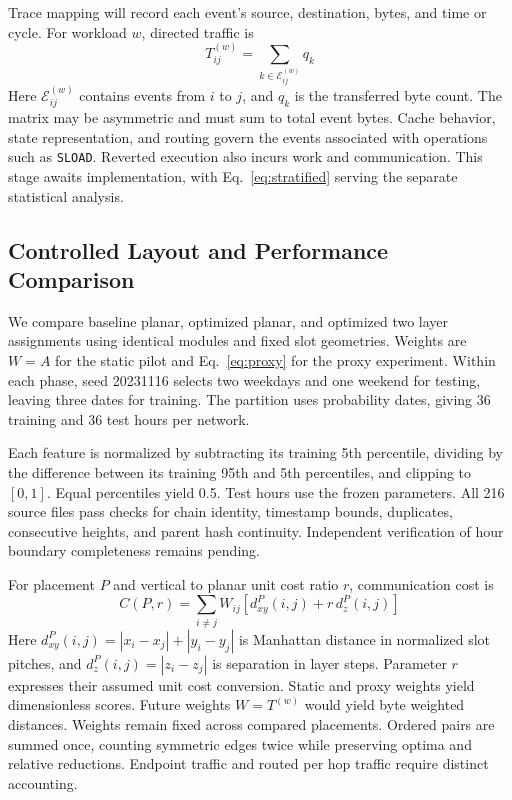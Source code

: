 \documentclass[runningheads]{llncs}
\begin{document}
Trace mapping will record each event's source, destination, bytes, and time or cycle. For workload $w$, directed traffic is
\begin{equation}
T_{ij}^{(w)}=\sum_{k\in\mathcal{E}_{ij}^{(w)}}q_k\label{eq:traffic}
\end{equation}
Here $\mathcal{E}_{ij}^{(w)}$ contains events from $i$ to $j$, and $q_k$ is the transferred byte count. The matrix may be asymmetric and must sum to total event bytes. Cache behavior, state representation, and routing govern the events associated with operations such as \texttt{SLOAD}. Reverted execution also incurs work and communication. This stage awaits implementation, with Eq.~\eqref{eq:stratified} serving the separate statistical analysis.

\subsection{Controlled Layout and Performance Comparison}
We compare baseline planar, optimized planar, and optimized two layer assignments using identical modules and fixed slot geometries. Weights are $W=A$ for the static pilot and Eq.~\eqref{eq:proxy} for the proxy experiment. Within each phase, seed 20231116 selects two weekdays and one weekend for testing, leaving three dates for training. The partition uses probability dates, giving 36 training and 36 test hours per network.

Each feature is normalized by subtracting its training 5th percentile, dividing by the difference between its training 95th and 5th percentiles, and clipping to $[0,1]$. Equal percentiles yield 0.5. Test hours use the frozen parameters. All 216 source files pass checks for chain identity, timestamp bounds, duplicates, consecutive heights, and parent hash continuity. Independent verification of hour boundary completeness remains pending.

For placement $P$ and vertical to planar unit cost ratio $r$, communication cost is
\begin{equation}
C(P,r)=\sum_{i\ne j}W_{ij}\left[d_{xy}^{P}(i,j)+r\,d_z^{P}(i,j)\right]\label{eq:cost}
\end{equation}
Here $d_{xy}^{P}(i,j)=|x_i-x_j|+|y_i-y_j|$ is Manhattan distance in normalized slot pitches, and $d_z^{P}(i,j)=|z_i-z_j|$ is separation in layer steps. Parameter $r$ expresses their assumed unit cost conversion. Static and proxy weights yield dimensionless scores. Future weights $W=T^{(w)}$ would yield byte weighted distances. Weights remain fixed across compared placements. Ordered pairs are summed once, counting symmetric edges twice while preserving optima and relative reductions. Endpoint traffic and routed per hop traffic require distinct accounting.
\end{document}
